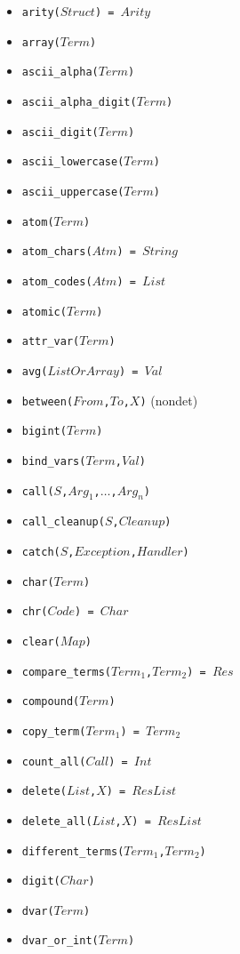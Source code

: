 \documentclass[10pt]{article}
\begin{document}
\begin{multicols}{2}
\begin{scriptsize}
\begin{itemize}
    \item \texttt{arity($Struct$) = $Arity$}
    \item \texttt{array($Term$)}
    \item \texttt{ascii\_alpha($Term$)}
    \item \texttt{ascii\_alpha\_digit($Term$)}
    \item \texttt{ascii\_digit($Term$)}
    \item \texttt{ascii\_lowercase($Term$)}
    \item \texttt{ascii\_uppercase($Term$)}
    \item \texttt{atom($Term$)} 
    \item \texttt{atom\_chars($Atm$) = $String$}
    \item \texttt{atom\_codes($Atm$) = $List$} 
    \item \texttt{atomic($Term$)} 
    \item \texttt{attr\_var($Term$)} 
    \item \texttt{avg($ListOrArray$) = $Val$}
    \item \texttt{between($From$,$To$,$X$)} (nondet)
    \item \texttt{bigint($Term$)}
    \item \texttt{bind\_vars($Term$,$Val$)}
    \item \texttt{call($S$,$Arg_1$,$\ldots$,$Arg_n$)} 
    \item \texttt{call\_cleanup($S$,$Cleanup$)} 
    \item \texttt{catch($S$,$Exception$,$Handler$)} 
    \item \texttt{char($Term$)} 
    \item \texttt{chr($Code$) = $Char$} 
    \item \texttt{clear($Map$)} 
    \item \texttt{compare\_terms($Term_1$,$Term_2$) = $Res$} 
    \item \texttt{compound($Term$)} 
    \item \texttt{copy\_term($Term_1$) = $Term_2$}
    \item \texttt{count\_all($Call$) = $Int$}
    \item \texttt{delete($List$,$X$) = $ResList$}
    \item \texttt{delete\_all($List$,$X$) = $ResList$}
    \item \texttt{different\_terms($Term_1$,$Term_2$)}
    \item \texttt{digit($Char$)}
    \item \texttt{dvar($Term$)}
    \item \texttt{dvar\_or\_int($Term$)}

\end{itemize}
\end{scriptsize}
\end{multicols}
\end{document}
